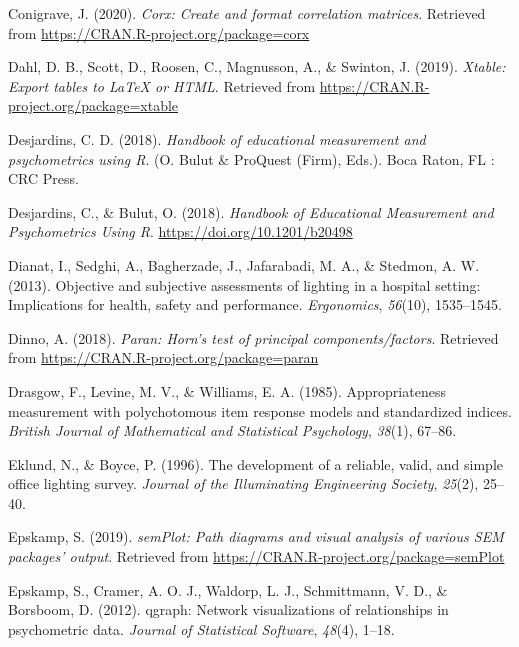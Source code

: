 \documentclass[
  english,
  man]{apa6}
\newlength{\cslhangindent}
\newlength{\cslentryspacingunit} %
\newenvironment{CSLReferences}[2] %
 {%
  \setlength{\parindent}{0pt}
  \ifodd #1
  \let\oldpar\par
  \def\par{\hangindent=\cslhangindent\oldpar}
  \fi
  \setlength{\parskip}{#2\cslentryspacingunit}
 }%
 {}
\begin{document}
\begin{CSLReferences}{1}{0}
\leavevmode{}%
Conigrave, J. (2020). \emph{Corx: Create and format correlation matrices}. Retrieved from \url{https://CRAN.R-project.org/package=corx}

\leavevmode{}%
Dahl, D. B., Scott, D., Roosen, C., Magnusson, A., \& Swinton, J. (2019). \emph{Xtable: Export tables to LaTeX or HTML}. Retrieved from \url{https://CRAN.R-project.org/package=xtable}

\leavevmode{}%
Desjardins, C. D. (2018). \emph{Handbook of educational measurement and psychometrics using {R}}. (O. Bulut \& ProQuest (Firm), Eds.). {Boca Raton, FL : CRC Press}.

\leavevmode{}%
Desjardins, C., \& Bulut, O. (2018). \emph{Handbook of {Educational Measurement} and {Psychometrics Using R}}. \url{https://doi.org/10.1201/b20498}

\leavevmode{}%
Dianat, I., Sedghi, A., Bagherzade, J., Jafarabadi, M. A., \& Stedmon, A. W. (2013). Objective and subjective assessments of lighting in a hospital setting: Implications for health, safety and performance. \emph{Ergonomics}, \emph{56}(10), 1535--1545.

\leavevmode{}%
Dinno, A. (2018). \emph{Paran: Horn's test of principal components/factors}. Retrieved from \url{https://CRAN.R-project.org/package=paran}

\leavevmode{}%
Drasgow, F., Levine, M. V., \& Williams, E. A. (1985). Appropriateness measurement with polychotomous item response models and standardized indices. \emph{British Journal of Mathematical and Statistical Psychology}, \emph{38}(1), 67--86.

\leavevmode{}%
Eklund, N., \& Boyce, P. (1996). The development of a reliable, valid, and simple office lighting survey. \emph{Journal of the Illuminating Engineering Society}, \emph{25}(2), 25--40.

\leavevmode{}%
Epskamp, S. (2019). \emph{semPlot: Path diagrams and visual analysis of various SEM packages' output}. Retrieved from \url{https://CRAN.R-project.org/package=semPlot}

\leavevmode{}%
Epskamp, S., Cramer, A. O. J., Waldorp, L. J., Schmittmann, V. D., \& Borsboom, D. (2012). {qgraph}: Network visualizations of relationships in psychometric data. \emph{Journal of Statistical Software}, \emph{48}(4), 1--18.


\end{CSLReferences}
\end{document}
